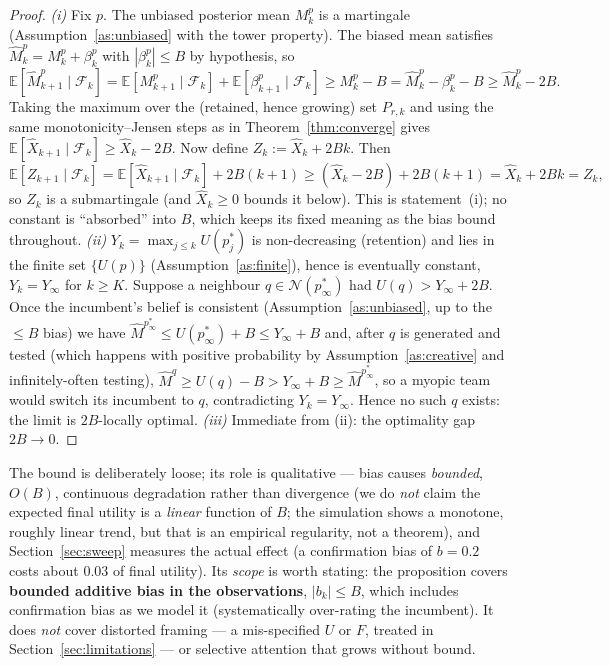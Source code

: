 \documentclass[11pt]{article}
\newcommand{\E}{\mathbb{E}}
\newcommand{\filt}{\mathcal{F}}     %
\begin{document}
\begin{proof}
\emph{(i)} Fix $p$. The unbiased posterior mean $M_k^{p}$ is a martingale (Assumption~\ref{as:unbiased} with the tower property). The biased mean satisfies $\widehat M_k^{p}=M_k^{p}+\beta_k^{p}$ with $|\beta_k^{p}|\le B$ by hypothesis, so
\[
\E[\widehat M_{k+1}^{p}\mid\filt_k]=\E[M_{k+1}^{p}\mid\filt_k]+\E[\beta_{k+1}^{p}\mid\filt_k]\ge M_k^{p}-B=\widehat M_k^{p}-\beta_k^{p}-B\ge \widehat M_k^{p}-2B.
\]
Taking the maximum over the (retained, hence growing) set $P_{r,k}$ and using the same monotonicity--Jensen steps as in Theorem~\ref{thm:converge} gives $\E[\widehat X_{k+1}\mid\filt_k]\ge \widehat X_k-2B$. Now define $Z_k:=\widehat X_k+2Bk$. Then
\[
\E[Z_{k+1}\mid\filt_k]=\E[\widehat X_{k+1}\mid\filt_k]+2B(k+1)\ge(\widehat X_k-2B)+2B(k+1)=\widehat X_k+2Bk=Z_k,
\]
so $Z_k$ is a submartingale (and $\widehat X_k\ge0$ bounds it below). This is statement~(i); no constant is ``absorbed'' into $B$, which keeps its fixed meaning as the bias bound throughout.
\emph{(ii)} $Y_k=\max_{j\le k}U(p_j^*)$ is non-decreasing (retention) and lies in the finite set $\{U(p)\}$ (Assumption~\ref{as:finite}), hence is eventually constant, $Y_k=Y_\infty$ for $k\ge K$. Suppose a neighbour $q\in\mathcal{N}(p^*_\infty)$ had $U(q)>Y_\infty+2B$. Once the incumbent's belief is consistent (Assumption~\ref{as:unbiased}, up to the $\le B$ bias) we have $\widehat M^{p^*_\infty}\le U(p^*_\infty)+B\le Y_\infty+B$ and, after $q$ is generated and tested (which happens with positive probability by Assumption~\ref{as:creative} and infinitely-often testing), $\widehat M^{q}\ge U(q)-B>Y_\infty+B\ge \widehat M^{p^*_\infty}$, so a myopic team would switch its incumbent to $q$, contradicting $Y_k=Y_\infty$. Hence no such $q$ exists: the limit is $2B$-locally optimal.
\emph{(iii)} Immediate from (ii): the optimality gap $2B\to0$.
\end{proof}

\noindent The bound is deliberately loose; its role is qualitative --- bias causes \emph{bounded}, $O(B)$, continuous degradation rather than divergence (we do \emph{not} claim the expected final utility is a \emph{linear} function of $B$; the simulation shows a monotone, roughly linear trend, but that is an empirical regularity, not a theorem), and Section~\ref{sec:sweep} measures the actual effect (a confirmation bias of $b=0.2$ costs about $0.03$ of final utility). Its \emph{scope} is worth stating: the proposition covers \textbf{bounded additive bias in the observations}, $|b_k|\le B$, which includes confirmation bias as we model it (systematically over-rating the incumbent). It does \emph{not} cover distorted framing --- a mis-specified $U$ or $F$, treated in Section~\ref{sec:limitations} --- or selective attention that grows without bound.
\end{document}
